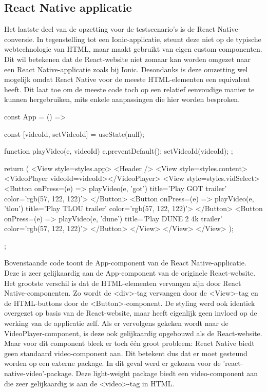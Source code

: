 \subsection{React Native applicatie}
\label{sec:react-native-applicatie}

Het laatste deel van de opzetting voor de testscenario's is de React Native-conversie. In tegenstelling tot een Ionic-applicatie, steunt deze niet op de typische webtechnologie van HTML, maar maakt gebruikt van eigen custom componenten. Dit wil betekenen dat de React-website niet zomaar kan worden omgezet naar een React Native-applicatie zoals bij Ionic. Desondanks is deze omzetting wel mogelijk omdat React Native voor de meeste HTML-elementen een equivalent heeft. Dit laat toe om de meeste code toch op een relatief eenvoudige manier te kunnen hergebruiken, mits enkele aanpassingen die hier worden besproken.

\begin{LVerbatim}[language=JavaScript, caption=Express API-endpoint voor het streamen van videobestanden]
const App = () => {
  const [videoId, setVideoId] = useState(null);

  function playVideo(e, videoId) {
    e.preventDefault();
    setVideoId(videoId);
  };

  return (
    <View style={styles.app}>
      <Header />
      <View style={styles.content}>
          <VideoPlayer videoId={videoId}></VideoPlayer>
          <View style={styles.vidSelect}>
            <Button
              onPress={(e) => playVideo(e, 'got')}
              title='Play GOT trailer'
              color={'rgb(57, 122, 122)'}>
            </Button>
            <Button
              onPress={(e) => playVideo(e, 'tlou')}
              title='Play TLOU trailer'
              color={'rgb(57, 122, 122)'}>
            </Button>
            <Button
              onPress={(e) => playVideo(e, 'dune')}
              title='Play DUNE 2 4k trailer'
              color={'rgb(57, 122, 122)'}>
            </Button>
        </View>
      </View>
    </View>
  );
};
\end{LVerbatim}

Bovenstaande code toont de App-component van de React Native-applicatie. Deze is zeer gelijkaardig aan de App-component van de originele React-website. Het grootste verschil is dat de HTML-elementen vervangen zijn door React Native-componenten. Zo wordt de <div>-tag vervangen door de <View>-tag en de HTML-buttons door de <Button>-component. De styling werd ook identiek overgezet op basis van de React-website, maar heeft eigenlijk geen invloed op de werking van de applicatie zelf. Als er vervolgens gekeken wordt naar de VideoPlayer-component, is deze ook gelijkaardig opgebouwd als de React-website. Maar voor dit component bleek er toch één groot probleem: React Native biedt geen standaard video-component aan. Dit betekent dus dat er moet gesteund worden op een externe package. In dit geval werd er gekozen voor de 'react-native-video'-package. Deze light-weight package biedt een video-component aan die zeer gelijkaardig is aan de <video>-tag in HTML.

